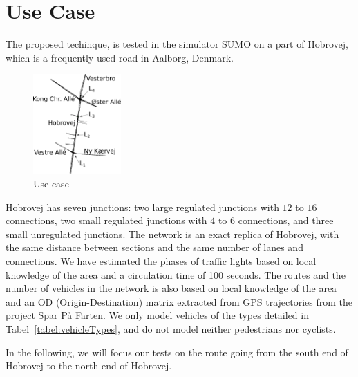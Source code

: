 \section{Use Case}\label{sec:UseCase}
The proposed techinque, \tech is tested in the simulator SUMO on a part of Hobrovej, which is a frequently used road in Aalborg, Denmark.

\begin{figure}[htb]
\centering
\includegraphics[width=0.3\textwidth]{../images/HobrovejNy.png}
\caption{Use case}
\label{fig:Introduction:hobro}
\end{figure}

Hobrovej has seven junctions: two large regulated junctions with $12$ to $16$ connections, two small regulated junctions with $4$ to $6$ connections, and three small unregulated junctions.
The network is an exact replica of Hobrovej, with the same distance between sections and the same number of lanes and connections. 
We have estimated the phases of traffic lights based on local knowledge of the area and a circulation time of 100 seconds.
The routes and the number of vehicles in the network is also based on local knowledge of the area and an OD (Origin-Destination) matrix extracted from GPS trajectories from the project Spar På Farten\cite{}.
We only model vehicles of the types detailed in Tabel~\ref{tabel:vehicleTypes}, and do not model neither pedestrians nor cyclists.

In the following, we will focus our tests on the route going from the south end of Hobrovej to the north end of Hobrovej.
